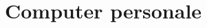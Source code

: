 \documentclass{report}
\begin{document}
    
    
    
    \tableofcontents

    \part{Computer personale}
        
        
\end{document}
